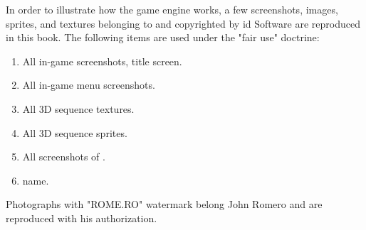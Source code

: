 In order to illustrate how the \doom{} game engine works, a few screenshots, images, sprites, and textures belonging to and copyrighted by id Software are reproduced in this book. The following items are used under the "fair use" doctrine:\\
\par
\begin{enumerate}
	\item All in-game screenshots, title screen.
	\item All in-game menu screenshots.
	\item All 3D sequence textures.
    \item All 3D sequence sprites.
    \item All screenshots of \doom.
    \item \doom{}name.
\end{enumerate}
\par
Photographs with "ROME.RO" watermark belong John Romero and are reproduced with his authorization.
